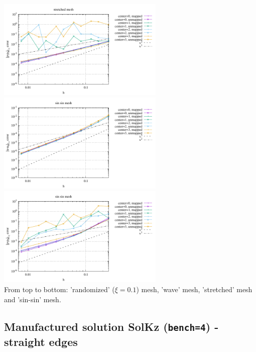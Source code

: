 \begin{center}
\includegraphics[width=8cm]{python_codes/fieldstone_76/results/bench9/curved/errors_P_mt4.pdf}\\
\includegraphics[width=8cm]{python_codes/fieldstone_76/results/bench9/curved/errors_V_mt5.pdf}
\includegraphics[width=8cm]{python_codes/fieldstone_76/results/bench9/curved/errors_P_mt5.pdf}\\
{\captionfont From top to bottom: 'randomized' ($\xi=0.1$) mesh,
'wave' mesh, 'stretched' mesh and 'sin-sin' mesh.}
\end{center}


\newpage
\subsection*{Manufactured solution SolKz ({\tt bench=4}) - straight edges}

